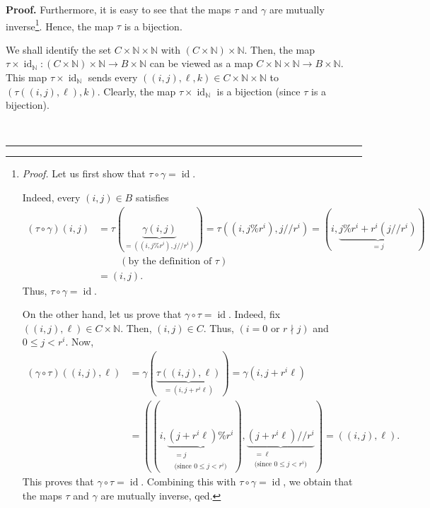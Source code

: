 \documentclass[numbers=enddot,12pt,final,onecolumn,notitlepage]{scrartcl}%
\theoremstyle{definition}
\newenvironment{proof}[1][Proof]{\noindent\textbf{#1.} }{\ \rule{0.5em}{0.5em}}
\begin{document}
\begin{proof}
Furthermore, it is easy to see that the maps $\tau$ and $\gamma$ are mutually
inverse\footnote{\textit{Proof.} Let us first show that $\tau\circ
\gamma=\operatorname*{id}$.
\par
Indeed, every $\left(  i,j\right)  \in B$ satisfies%
\begin{align*}
\left(  \tau\circ\gamma\right)  \left(  i,j\right)   &  =\tau\left(
\underbrace{\gamma\left(  i,j\right)  }_{=\left(  \left(  i,j\%r^{i}\right)
,j//r^{i}\right)  }\right)  =\tau\left(  \left(  i,j\%r^{i}\right)
,j//r^{i}\right)  =\left(  i,\underbrace{j\%r^{i}+r^{i}\left(  j//r^{i}%
\right)  }_{=j}\right) \\
&  \ \ \ \ \ \ \ \ \ \ \left(  \text{by the definition of }\tau\right) \\
&  =\left(  i,j\right)  .
\end{align*}
Thus, $\tau\circ\gamma=\operatorname*{id}$.
\par
On the other hand, let us prove that $\gamma\circ\tau=\operatorname*{id}$.
Indeed, fix $\left(  \left(  i,j\right)  ,\ell\right)  \in C\times\mathbb{N}$.
Then, $\left(  i,j\right)  \in C$. Thus, $\left(  i=0\text{ or }r\nmid
j\right)  $ and $0\leq j<r^{i}$. Now,%
\begin{align*}
\left(  \gamma\circ\tau\right)  \left(  \left(  i,j\right)  ,\ell\right)   &
=\gamma\left(  \underbrace{\tau\left(  \left(  i,j\right)  ,\ell\right)
}_{=\left(  i,j+r^{i}\ell\right)  }\right)  =\gamma\left(  i,j+r^{i}%
\ell\right) \\
&  =\left(  \left(  i,\underbrace{\left(  j+r^{i}\ell\right)  \%r^{i}%
}_{\substack{=j\\\text{(since }0\leq j<r^{i}\text{)}}}\right)
,\underbrace{\left(  j+r^{i}\ell\right)  //r^{i}}_{\substack{=\ell
\\\text{(since }0\leq j<r^{i}\text{)}}}\right)  =\left(  \left(  i,j\right)
,\ell\right)  .
\end{align*}
This proves that $\gamma\circ\tau=\operatorname*{id}$. Combining this with
$\tau\circ\gamma=\operatorname*{id}$, we obtain that the maps $\tau$ and
$\gamma$ are mutually inverse, qed.}. Hence, the map $\tau$ is a bijection.

We shall identify the set $C\times\mathbb{N}\times\mathbb{N}$ with $\left(
C\times\mathbb{N}\right)  \times\mathbb{N}$. Then, the map $\tau
\times\operatorname*{id}\nolimits_{\mathbb{N}}:\left(  C\times\mathbb{N}%
\right)  \times\mathbb{N}\rightarrow B\times\mathbb{N}$ can be viewed as a map
$C\times\mathbb{N}\times\mathbb{N}\rightarrow B\times\mathbb{N}$. This map
$\tau\times\operatorname*{id}\nolimits_{\mathbb{N}}$ sends every $\left(
\left(  i,j\right)  ,\ell,k\right)  \in C\times\mathbb{N}\times\mathbb{N}$ to
$\left(  \tau\left(  \left(  i,j\right)  ,\ell\right)  ,k\right)  $. Clearly,
the map $\tau\times\operatorname*{id}\nolimits_{\mathbb{N}}$ is a bijection
(since $\tau$ is a bijection).


\end{proof}
\end{document}
